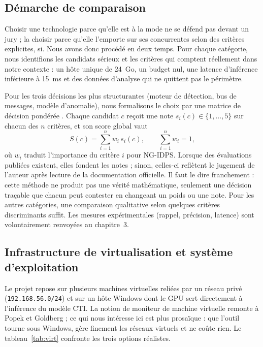 \subsection{Démarche de comparaison}

Choisir une technologie parce qu'elle est à la mode ne se défend pas devant un jury ; la choisir parce qu'elle l'emporte sur ses concurrentes selon des critères explicites, si. Nous avons donc procédé en deux temps. Pour chaque catégorie, nous identifions les candidats sérieux et les critères qui comptent réellement dans notre contexte : un hôte unique de 24~Go, un budget nul, une latence d'inférence inférieure à 15~ms et des données d'analyse qui ne quittent pas le périmètre.

Pour les trois décisions les plus structurantes (moteur de détection, bus de messages, modèle d'anomalie), nous formalisons le choix par une matrice de décision pondérée \cite{triantaphyllou2000mcdm}. Chaque candidat $c$ reçoit une note $s_i(c) \in \{1,\dots,5\}$ sur chacun des $n$ critères, et son score global vaut
\begin{equation}
S(c) = \sum_{i=1}^{n} w_i \, s_i(c), \qquad \sum_{i=1}^{n} w_i = 1,
\label{eq:wsm}
\end{equation}
où $w_i$ traduit l'importance du critère $i$ pour NG-IDPS. Lorsque des évaluations publiées existent, elles fondent les notes ; sinon, celles-ci reflètent le jugement de l'auteur après lecture de la documentation officielle. Il faut le dire franchement : cette méthode ne produit pas une vérité mathématique, seulement une décision traçable que chacun peut contester en changeant un poids ou une note. Pour les autres catégories, une comparaison qualitative selon quelques critères discriminants suffit. Les mesures expérimentales (rappel, précision, latence) sont volontairement renvoyées au chapitre~3.

\subsection{Infrastructure de virtualisation et système d'exploitation}

Le projet repose sur plusieurs machines virtuelles reliées par un réseau privé (\texttt{192.168.56.0/24}) et sur un hôte Windows dont le GPU sert directement à l'inférence du modèle CTI. La notion de moniteur de machine virtuelle remonte à Popek et Goldberg \cite{popek1974virtualizable} ; ce qui nous intéresse ici est plus prosaïque : que l'outil tourne sous Windows, gère finement les réseaux virtuels et ne coûte rien. Le tableau~\ref{tab:virt} confronte les trois options réalistes.

